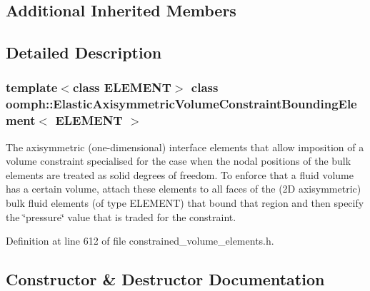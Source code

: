 \subsection*{Additional Inherited Members}


\subsection{Detailed Description}
\subsubsection*{template$<$class E\+L\+E\+M\+E\+NT$>$\newline
class oomph\+::\+Elastic\+Axisymmetric\+Volume\+Constraint\+Bounding\+Element$<$ E\+L\+E\+M\+E\+N\+T $>$}

The axisymmetric (one-\/dimensional) interface elements that allow imposition of a volume constraint specialised for the case when the nodal positions of the bulk elements are treated as solid degrees of freedom. To enforce that a fluid volume has a certain volume, attach these elements to all faces of the (2D axisymmetric) bulk fluid elements (of type E\+L\+E\+M\+E\+NT) that bound that region and then specify the \char`\"{}pressure\char`\"{} value that is traded for the constraint. 

Definition at line 612 of file constrained\+\_\+volume\+\_\+elements.\+h.



\subsection{Constructor \& Destructor Documentation}
\mbox{\label{classoomph_1_1ElasticAxisymmetricVolumeConstraintBoundingElement_a533376e1f314fabc4c014f9c7547f5e8}} 
